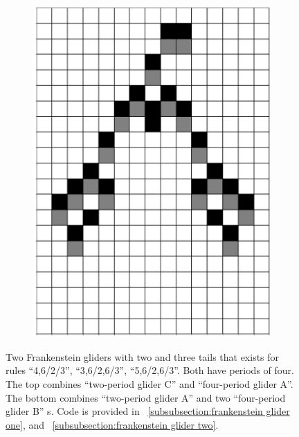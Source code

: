 \documentclass[12pt]{article}
\numberwithin{figure}{section} %
\begin{document}
\begin{figure}[H]
\begin{subfigure}{0.19\textwidth}
     \includegraphics[width=\linewidth]{Section4/26.4}
     \subcaption{}
   \end{subfigure}
   \setcounter{subfigure}{0}
\caption[Frankenstein gliders]{Two Frankenstein gliders with two and three tails that exists for rules “4,6/2/3”, “3,6/2,6/3”, “5,6/2,6/3”. Both have periods of four. The top combines “two-period glider C” and “four-period glider A”. The bottom combines “two-period glider A” and two “four-period glider B” s. Code is provided in ~\ref{subsubsection:frankenstein glider one}, and ~\ref{subsubsection:frankenstein glider two}.}
\label{fig:frankenstein gliders}
\end{figure}
\end{document}
